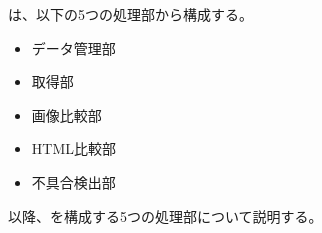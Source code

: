 \toolName は、以下の5つの処理部から構成する。
\begin{itemize}
    \item データ管理部
    \item 取得部
    \item 画像比較部
    \item HTML比較部
    \item 不具合検出部
\end{itemize}
以降、\toolName を構成する5つの処理部について説明する。
\par


